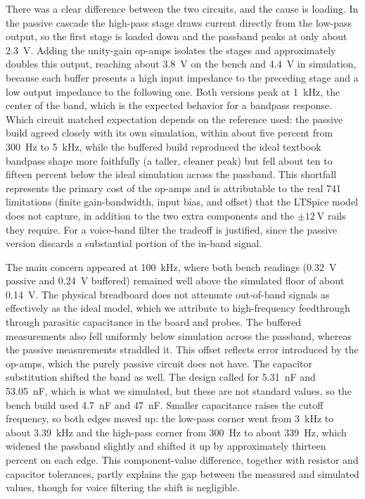 \documentclass[11pt]{article}
\begin{document}
There was a clear difference between the two circuits, and the cause is loading.
In the passive cascade the high-pass stage draws current directly from the low-pass
output, so the first stage is loaded down and the passband peaks at only about
\SI{2.3}{\volt}. Adding the unity-gain op-amps isolates the stages and approximately
doubles this output, reaching about \SI{3.8}{\volt} on the bench and \SI{4.4}{\volt}
in simulation, because each buffer presents a high input impedance to the preceding
stage and a low output impedance to the following one. Both versions peak at
\SI{1}{\kilo\hertz}, the center of the band, which is the expected behavior for a
bandpass response. Which circuit matched expectation depends on the reference used:
the passive build agreed closely with its own simulation, within about five percent
from \SI{300}{\hertz} to \SI{5}{\kilo\hertz}, while the buffered build reproduced the
ideal textbook bandpass shape more faithfully (a taller, cleaner peak) but fell about
ten to fifteen percent below the ideal simulation across the passband. This shortfall
represents the primary cost of the op-amps and is attributable to the real 741
limitations (finite gain-bandwidth, input bias, and offset) that the LTSpice model
does not capture, in addition to the two extra components and the
\(\pm\SI{12}{\volt}\) rails they require. For a voice-band filter the tradeoff is
justified, since the passive version discards a substantial portion of the in-band
signal.

The main concern appeared at \SI{100}{\kilo\hertz}, where both bench readings
(\SI{0.32}{\volt} passive and \SI{0.24}{\volt} buffered) remained well above the
simulated floor of about \SI{0.14}{\volt}. The physical breadboard does not attenuate
out-of-band signals as effectively as the ideal model, which we attribute to
high-frequency feedthrough through parasitic capacitance in the board and probes. The
buffered measurements also fell uniformly below simulation across the passband,
whereas the passive measurements straddled it. This offset reflects error introduced
by the op-amps, which the purely passive circuit does not have. The capacitor
substitution shifted the band as well. The design called for \SI{5.31}{\nano\farad}
and \SI{53.05}{\nano\farad}, which is what we simulated, but these are not standard
values, so the bench build used \SI{4.7}{\nano\farad} and \SI{47}{\nano\farad}.
Smaller capacitance raises the cutoff frequency, so both edges moved up: the low-pass
corner went from \SI{3}{\kilo\hertz} to about \SI{3.39}{\kilo\hertz} and the high-pass
corner from \SI{300}{\hertz} to about \SI{339}{\hertz}, which widened the passband
slightly and shifted it up by approximately thirteen percent on each edge. This
component-value difference, together with resistor and capacitor tolerances, partly
explains the gap between the measured and simulated values, though for voice filtering
the shift is negligible.

\end{document}
